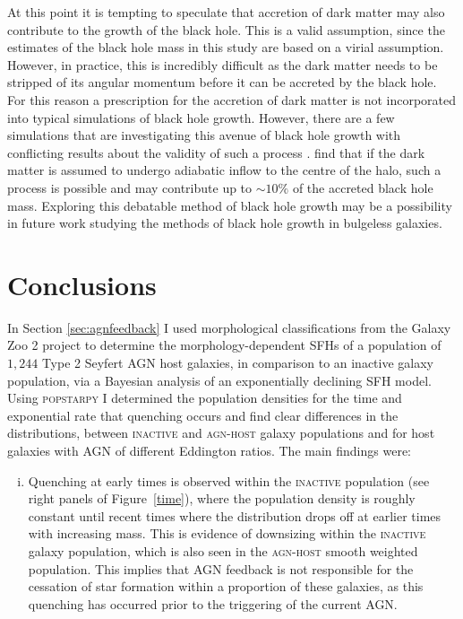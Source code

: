 {At this point it is tempting to speculate that accretion of dark matter may also contribute to the growth of the black hole. This is a valid assumption, since the estimates of the black hole mass in this study are based on a virial assumption. However, in practice, this is incredibly difficult as the dark matter needs to be stripped of its angular momentum before it can be accreted by the black hole. For this reason a prescription for the accretion of dark matter is not incorporated into typical simulations of black hole growth. However, there are a few simulations that are investigating this avenue of black hole growth with conflicting results about the validity of such a process \citep{munyaneza06, peirani08, umeda09, hernandez10, guzman11, pepe12, lora14}. \cite{peirani08} find that if the dark matter is assumed to undergo adiabatic inflow to the centre of the halo, such a process is possible and may contribute up to $\sim10\%$ of the accreted black hole mass. Exploring this debatable method of black hole growth may be a possibility in future work studying the methods of black hole growth in bulgeless galaxies. 

\section{Conclusions}\label{sec:agnconclusion}

In Section \ref{sec:agnfeedback} I used morphological classifications from the Galaxy Zoo 2 project to determine the morphology-dependent SFHs of a population of $1,244$ Type 2 Seyfert AGN host galaxies, in comparison to an inactive galaxy population, via a Bayesian analysis of an exponentially declining SFH model. Using \textsc{popstarpy} I determined the population densities for the time and exponential rate that quenching occurs and find clear differences in the distributions, between \textsc{inactive} and \textsc{agn-host} galaxy populations and for host galaxies with AGN of different Eddington ratios. The main findings were:

\begin{enumerate}[(i)]
\item Quenching at early times is observed within the \textsc{inactive} population (see right panels of Figure~\ref{time}), where the population density is roughly constant until recent times where the distribution drops off at earlier times with increasing mass. This is evidence of downsizing within the \textsc{inactive} galaxy population, which is also seen in the \textsc{agn-host} smooth weighted population. This implies that AGN feedback is not responsible for the cessation of star formation within a proportion of these galaxies, as this quenching has occurred prior to the triggering of the current AGN.


\end{enumerate}}
